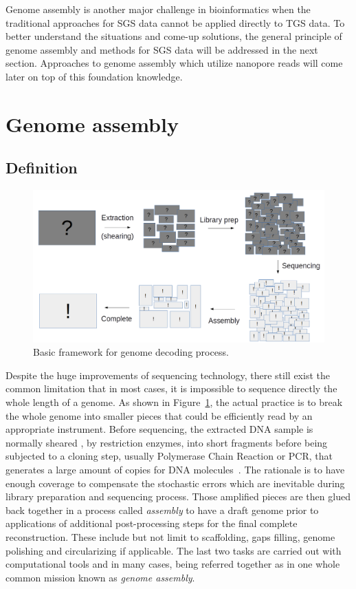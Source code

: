 Genome assembly is another major challenge in bioinformatics when the traditional approaches for SGS data cannot be applied directly to TGS data.
To better understand the situations and come-up solutions, the general principle of genome assembly and methods for SGS data will be addressed in the next section.
Approaches to genome assembly which utilize nanopore reads will come later on top of this foundation knowledge. 

\section{Genome assembly}\label{sec:gass}
\subsection{Definition}
\begin{figure}[ht!]
\centering
\includegraphics[width=.9\textwidth]{images/genome_decoding.png}
\caption{Basic framework for genome decoding process.} 
\label{Fig:decoding}
\end{figure}

Despite the huge improvements of sequencing technology, there still exist the common limitation that in most cases, it is impossible to sequence directly the whole length of a genome. As shown in Figure~\ref{Fig:decoding}, the actual practice is to break the whole genome into smaller pieces that could be efficiently read by an appropriate instrument. 
Before sequencing, the extracted DNA sample is normally sheared , \EG{} by restriction enzymes, into short fragments before being subjected to a cloning step, usually Polymerase Chain Reaction or PCR, that generates a large amount of copies for DNA molecules~\cite{Garibyan2013research}. The rationale is to have enough coverage to compensate the stochastic errors which are inevitable during library preparation and sequencing process. 
Those amplified pieces are then glued back together in a process called \emph{assembly} to have a draft genome prior to applications of additional post-processing steps for the final complete reconstruction.  
These include but not limit to scaffolding, gaps filling, genome polishing and circularizing if applicable.
The last two tasks are carried out with computational tools and in many cases, being referred together as in one whole common mission known as \emph{genome assembly}. 

